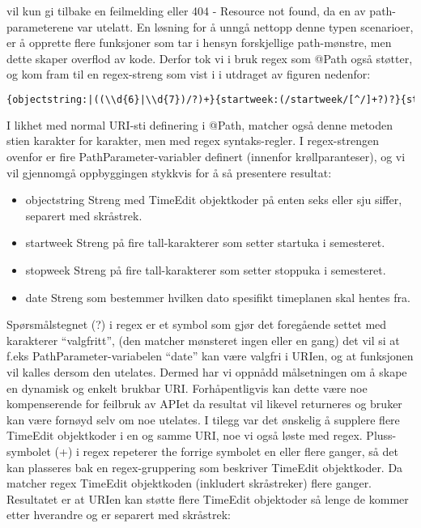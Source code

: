 \documentclass[../main.tex]{subfiles}
\begin{document}
vil kun gi tilbake en feilmelding eller 404 - Resource not found, da en av path-parameterene var utelatt. En løsning for å unngå nettopp denne typen scenarioer, er å opprette flere funksjoner som tar i hensyn forskjellige path-mønstre, men dette skaper overflod av kode.
Derfor tok vi i bruk regex som @Path også støtter, og kom fram til en regex-streng som vist i i utdraget av figuren nedenfor:

\begin{lstlisting}[language=HTML, frame=single, caption={Selve strengen inne i en @Path variabel med regex}]
{objectstring:|((\\d{6}|\\d{7})/?)+}{startweek:(/startweek/[^/]+?)?}{stopweek:(/stopweek/[^/]+?)?}{date:(/date/[^/]+?)?}
\end{lstlisting}

I likhet med normal URI-sti definering i @Path, matcher også denne metoden stien karakter for karakter, men med regex syntaks-regler. I regex-strengen ovenfor er fire PathParameter-variabler definert (innenfor krøllparanteser), og vi vil gjennomgå oppbyggingen stykkvis for å så presentere resultat:

\begin{itemize}
\item objectstring \newline Streng med TimeEdit objektkoder på enten seks eller sju siffer, separert med skråstrek.
\item startweek \newline Streng på fire tall-karakterer som setter startuka i semesteret.
\item stopweek \newline Streng på fire tall-karakterer som setter stoppuka i semesteret.
\item date \newline Streng som bestemmer hvilken dato spesifikt timeplanen skal hentes fra.
\end{itemize}

Spørsmålstegnet (?) i regex er et symbol som gjør det foregående settet med karakterer “valgfritt”, (den matcher mønsteret ingen eller en gang) det vil si at f.eks PathParameter-variabelen “date” kan være valgfri i URIen, og at funksjonen vil kalles dersom den utelates. Dermed har vi oppnådd målsetningen om å skape en dynamisk og enkelt brukbar URI. Forhåpentligvis kan dette være noe kompenserende for feilbruk av APIet da resultat vil likevel returneres og bruker kan være fornøyd selv om noe utelates.
\newline
I tilegg var det ønskelig å supplere flere TimeEdit objektkoder i en og samme URI, noe vi også løste med regex. Pluss-symbolet (+) i regex repeterer the forrige symbolet en eller flere ganger, så det kan plasseres bak en regex-gruppering som beskriver TimeEdit objektkoder. Da matcher regex TimeEdit objektkoden (inkludert skråstreker) flere ganger. Resultatet er at URIen kan støtte flere TimeEdit objektoder så lenge de kommer etter hverandre og er separert med skråstrek:
\end{document}
